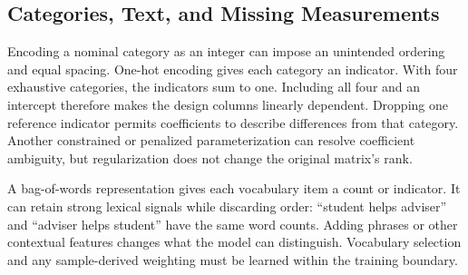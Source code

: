 \subsection{Categories, Text, and Missing Measurements}

Encoding a nominal category as an integer can impose an unintended ordering and equal spacing. One-hot encoding gives each category an indicator. With four exhaustive categories, the indicators sum to one. Including all four and an intercept therefore makes the design columns linearly dependent. Dropping one reference indicator permits coefficients to describe differences from that category. Another constrained or penalized parameterization can resolve coefficient ambiguity, but regularization does not change the original matrix's rank.

A bag-of-words representation gives each vocabulary item a count or indicator. It can retain strong lexical signals while discarding order: ``student helps adviser'' and ``adviser helps student'' have the same word counts. Adding phrases or other contextual features changes what the model can distinguish. Vocabulary selection and any sample-derived weighting must be learned within the training boundary.

\par\addvspace{\intextsep}\noindent\begin{minipage}{\linewidth}
\centering
{}
\label{fig:feature-encodings}
\end{minipage}\par\addvspace{\intextsep}

